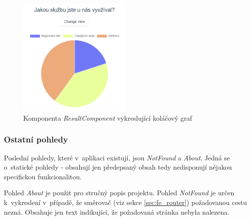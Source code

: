		\begin{figure}[h]
			\centering
			\includegraphics[width=0.5\textwidth]{img/pohledy/formresults_graf.png}
			\caption{Komponenta \textit{ResultComponent} vykreslující koláčový graf}
			\label{fig:pohled_formresults_graf}
		\end{figure}
		
		\subsubsection{Ostatní pohledy} %
		Poslední pohledy, které v~aplikaci existují, jsou \textit{NotFound} a \textit{About}. Jedná se o~statické pohledy - obsahují jen předepsaný obsah tedy nedisponují nějakou specifickou funkcionalitou. 
		
		Pohled \textit{About} je použit pro stručný popis projektu. Pohled \textit{NotFound} je určen k~vykreslení v~případě, že směrovač (viz sekce \ref{sec:fe_router}) požadovanou cestu nezná. Obsahuje jen text indikující, že požadovaná stránka nebyla nalezena.
